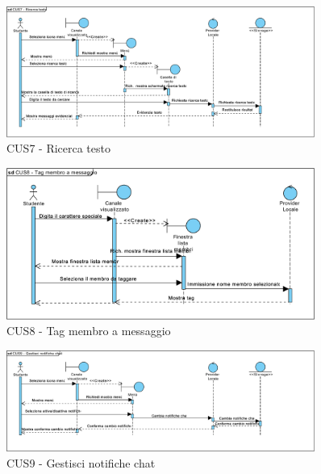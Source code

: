 \begin{figure}
	\centering
	\includegraphics[width=0.9\textwidth]{imgs/gruppo6/sequence/CUS7_ricerca_testo.pdf}
	\caption{CUS7 - Ricerca testo}
	\label{fig:seq-cus7}
\end{figure}

\begin{figure}
	\centering
	\includegraphics[width=0.9\textwidth]{imgs/gruppo6/sequence/CUS8_tag_membro_a_messaggio.pdf}
	\caption{CUS8 - Tag membro a messaggio}
	\label{fig:seq-cus8}
\end{figure}

\begin{figure}
	\centering
	\includegraphics[width=0.9\textwidth]{imgs/gruppo6/sequence/CUS9_gestisci_notifiche_chat.pdf}
	\caption{CUS9 - Gestisci notifiche chat}
	\label{fig:seq-cus9}
\end{figure}

